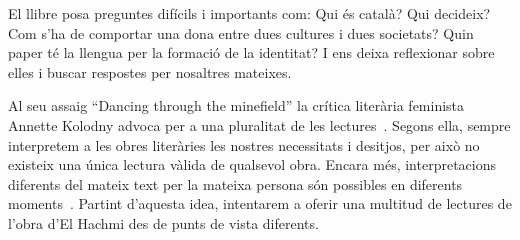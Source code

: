 El llibre posa preguntes difícils i importants com:
Qui és català? Qui decideix?
Com s'ha de comportar una dona entre dues cultures i dues societats?
Quin paper té la llengua per la formació de la identitat?
I ens deixa reflexionar sobre elles i buscar respostes per nosaltres mateixes.

Al seu assaig ``Dancing through the minefield'' la crítica literària feminista Annette Kolodny advoca per a una pluralitat de les lectures~\autocite{Kolodny1980}.
Segons ella, sempre interpretem a les obres literàries les nostres necessitats i desitjos, per això no existeix una única lectura vàlida de qualsevol obra.
Encara més, interpretacions diferents del mateix text per la mateixa persona són possibles en diferents moments~\autocite{Kolodny1980}.
Partint d'aquesta idea, intentarem a oferir una multitud de lectures de l'obra d'El Hachmi des de punts de vista diferents.

\begin{comment}
\subsection{Estructura de la monografia}
Aquest treball està organitzat de la següent manera.
Primer, presentarem el marc teòric dins el qual volem analitzar el roman ``L'últim patriarca''.
A continuació, discutirem multiples facetes de l'obra i proposarem lectures diferents.
En conclusió, ...
\end{comment}

\begin{comment}
Fragestellung:
??
verschiedene readings anbieten:
* interseccionalitat
* translation/language
* laurie penny

--> adrienne rich/anette kolodny in die intro nehmen
Annette Kolodny: "In my view, our purpose is not and should not be the formulation of
any single reading method or potentially procrustean set of critical procedures[...] Instead, as I see it, our
task is to initiate nothing less than a playful pluralism, responsice to the possibilities of multiple critical
schools and methods, but captive of none.."

Leitfragen/themen:
* Qui és català? Qui decideix?
* La dona entre dues cultures i dues societats: expectacions, sentiments,... | interseccionalitat
* La dona en una societat machista                                           |
* coming-of-age
* el paper de la llengua

------

Motto candidates:

“The greatest masterpiece in literature is only a dictionary out of order.”
― Jean Cocteau
VA: Jean Cocteau once quipped that even the greatest masterpieces of literature are nothing but a
dictionary out of order.
(Stavans: Dictionaries Interview)

"IS: Every translation is a misrepresentation."
(Stavans: Dictionaries Interview)
\end{comment}
